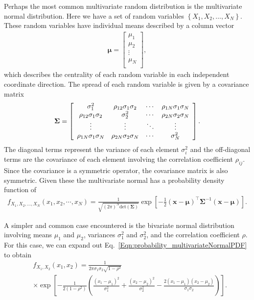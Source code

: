 Perhaps the most common multivariate random distribution is the multivariate normal distribution. Here we have a set of random variables $\left\{ X_1, X_2, \ldots, X_N \right\}$. These random variables have individual means described by a column vector
\begin{align}
  \boldsymbol\mu = \left[ \begin{array}{c} \mu_1 \\ \mu_2 \\ \vdots \\ \mu_N \\ \end{array} \right] ,
\end{align}
which describes the centrality of each random variable in each independent coordinate direction. The spread of each random variable is given by a covariance matrix
\begin{align}
  \boldsymbol\Sigma = \left[ \begin{array}{c c c c} 
  \sigma^2_1                  & \rho_{12} \sigma_1 \sigma_2 & \cdots & \rho_{1N} \sigma_1 \sigma_N \\ 
  \rho_{12} \sigma_1 \sigma_2 & \sigma^2_2                  & \cdots & \rho_{2N} \sigma_2 \sigma_N \\ 
  \vdots                      & \vdots                      & \ddots & \vdots                      \\
  \rho_{1N} \sigma_1 \sigma_N & \rho_{2N} \sigma_2 \sigma_N & \cdots & \sigma^2_N                  \\  
  \end{array} \right] .
\end{align}
The diagonal terms represent the variance of each element $\sigma^2_i$ and the off-diagonal terms are the covariance of each element involving the correlation coefficient $\rho_{ij}$. Since the covariance is a symmetric operator, the covariance matrix is also symmetric. Given these the multivariate normal has a probability density function of
\begin{align} \label{Eqn:probability_multivariateNormalPDF}
  f_{X_1,X_2,\ldots,X_N}(x_1,x_2,\cdots,x_N) = 
  \frac{1}{\sqrt{(2\pi)^N \mathrm{det}(\boldsymbol\Sigma)}} 
  \exp \left[ -\frac{1}{2} \left( \mathbf{x} - \boldsymbol\mu \right)^\top \boldsymbol\Sigma^{-1} \left( \mathbf{x} - \boldsymbol\mu \right) \right] .
\end{align}

A simpler and common case encountered is the bivariate normal distribution involving means $\mu_1$ and $\mu_2$, variances $\sigma_1^2$ and $\sigma_2^2$, and the correlation coefficient $\rho$. For this case, we can expand out Eq.~\eqref{Eqn:probability_multivariateNormalPDF} to obtain
\begin{align}
  &f_{X_1,X_2}(x_1,x_2) = \frac{1}{2\pi \sigma_1 \sigma_2 \sqrt{ 1 - \rho^2 } } \nonumber \\
  &\times \exp \left[ -\frac{1}{2 ( 1 - \rho^2 ) } 
               \left( \frac{(x_1 - \mu_1)^2}{\sigma_1^2} + \frac{(x_2 - \mu_2)^2}{\sigma_2^2} - \frac{2 (x_1 - \mu_1) (x_2 - \mu_2) }{\sigma_1 \sigma_2} \right) \right] .
\end{align}


